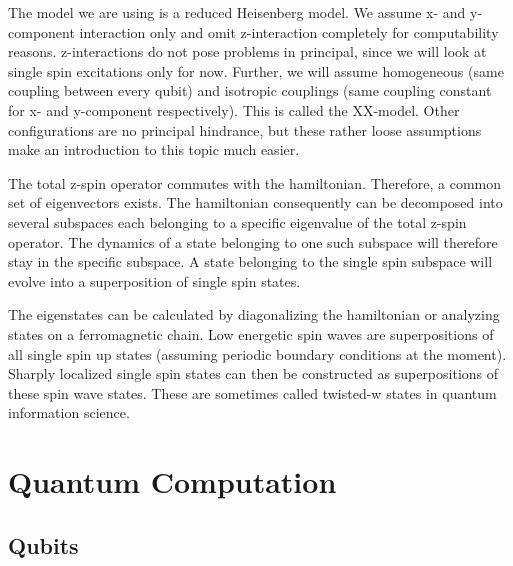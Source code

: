 \noindent The model we are using is a reduced Heisenberg model. We assume x- and y-component interaction only and omit z-interaction completely for computability reasons. z-interactions do not pose problems in principal, since we will look at single spin excitations only for now. Further, we will assume homogeneous (same coupling between every qubit) and isotropic couplings (same coupling constant for x- and y-component respectively). This is called the XX-model. Other configurations are no principal hindrance, but these rather loose assumptions make an introduction to this topic much easier.\par
The total z-spin operator commutes with the hamiltonian. Therefore, a common set of eigenvectors exists. The hamiltonian consequently can be decomposed into several subspaces each belonging to a specific eigenvalue of the total z-spin operator. The dynamics of a state belonging to one such subspace will therefore stay in the specific subspace. A state belonging to the single spin subspace will evolve into a superposition of single spin states.\par
The eigenstates can be calculated by diagonalizing the hamiltonian or analyzing states on a ferromagnetic chain\cite{Stolze2014}. Low energetic spin waves are superpositions of all single spin up states (assuming periodic boundary conditions at the moment). Sharply localized single spin states can then be constructed as superpositions of these spin wave states. These are sometimes called twisted-w states in quantum information science\cite{Osborne2004}. 

\section{Quantum Computation}
\subsection{Qubits}

